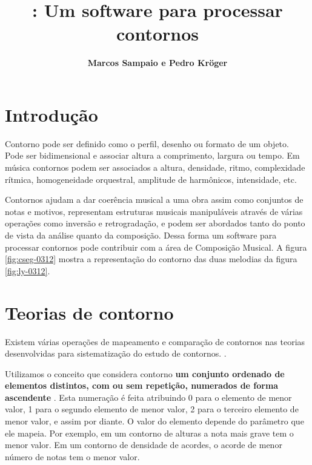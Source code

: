 \documentclass{sciposter}
\title{\goiaba{}: Um software para processar contornos}
\author{\textbf{Marcos Sampaio e Pedro Kröger}}
\institute{Genos---Grupo de pesquisa em computação musical}
\begin{document}



\maketitle

\begin{multicols}{3}

\section{Introdução}

Contorno pode ser definido como o perfil, desenho ou formato de um
objeto. Pode ser bidimensional e associar altura a comprimento,
largura ou tempo. Em música contornos podem ser associados a altura,
densidade, ritmo, complexidade rítmica, homogeneidade orquestral,
amplitude de harmônicos, intensidade, etc. 

Contornos ajudam a dar coerência musical a uma obra assim como
conjuntos de notas e motivos, representam estruturas musicais
manipuláveis através de várias operações como inversão e
retrogradação, e podem ser abordados tanto do ponto de vista da
análise quanto da composição. Dessa forma um software para processar
contornos pode contribuir com a área de Composição Musical. A figura
\ref{fig:cseg-0312} mostra a representação do contorno das duas
melodias da figura \ref{fig:ly-0312}.

\section{Teorias de contorno}

Existem várias operações de mapeamento e comparação de contornos nas
teorias desenvolvidas para sistematização do estudo de contornos.
\cite{friedmann85:methodology,friedmann87:response,morris87:composition,morris93:directions,marvin.ea87:relating,clifford95:contour,polansky.ea92:possible,quinn97:fuzzy,beard03:contour}.

Utilizamos o conceito que considera contorno \textbf{um conjunto
  ordenado de elementos distintos, com ou sem repetição, numerados de
  forma ascendente} \cite[p. 206]{morris93:directions}. Esta numeração
é feita atribuindo 0 para o elemento de menor valor, 1 para o segundo
elemento de menor valor, 2 para o terceiro elemento de menor valor, e
assim por diante. O valor do elemento depende do parâmetro que ele
mapeia. Por exemplo, em um contorno de alturas a nota mais grave tem o
menor valor. Em um contorno de densidade de acordes, o acorde de menor
número de notas tem o menor valor.


\end{multicols}
\end{document}
